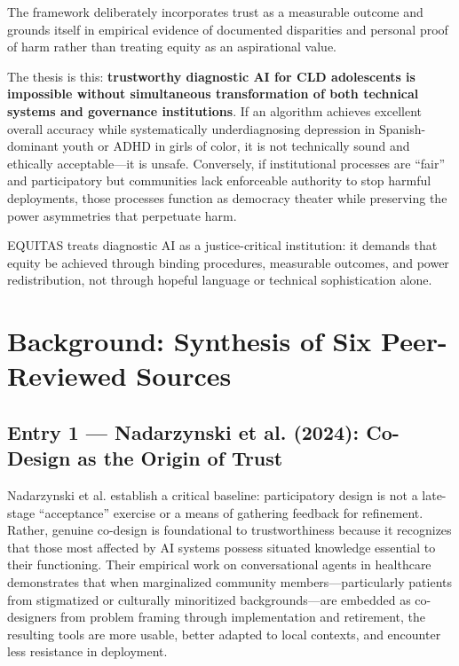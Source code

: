 \documentclass[12pt,a4paper]{article}
\begin{document}
The framework deliberately incorporates trust as a measurable outcome \cite{sagona2025} and grounds itself in empirical evidence of documented disparities \cite{marko2025} and personal proof of harm \cite{garcia_ed415} rather than treating equity as an aspirational value.

The thesis is this: \textbf{trustworthy diagnostic AI for CLD adolescents is impossible without simultaneous transformation of both technical systems and governance institutions}. If an algorithm achieves excellent overall accuracy while systematically underdiagnosing depression in Spanish-dominant youth or ADHD in girls of color, it is not technically sound and ethically acceptable—it is unsafe.\cite{marko2025} Conversely, if institutional processes are ``fair'' and participatory but communities lack enforceable authority to stop harmful deployments, those processes function as democracy theater while preserving the power asymmetries that perpetuate harm.\cite{garcia_ed415}

EQUITAS treats diagnostic AI as a justice-critical institution: it demands that equity be achieved through binding procedures, measurable outcomes, and power redistribution, not through hopeful language or technical sophistication alone.

\section{Background: Synthesis of Six Peer-Reviewed Sources}

\subsection{Entry 1 — Nadarzynski et al. (2024): Co-Design as the Origin of Trust}

Nadarzynski et al. establish a critical baseline: participatory design is not a late-stage ``acceptance'' exercise or a means of gathering feedback for refinement. Rather, genuine co-design is foundational to trustworthiness because it recognizes that those most affected by AI systems possess situated knowledge essential to their functioning.\cite{nadarzynski2024} Their empirical work on conversational agents in healthcare demonstrates that when marginalized community members—particularly patients from stigmatized or culturally minoritized backgrounds—are embedded as co-designers from problem framing through implementation and retirement, the resulting tools are more usable, better adapted to local contexts, and encounter less resistance in deployment.\cite{nadarzynski2024}
\end{document}
